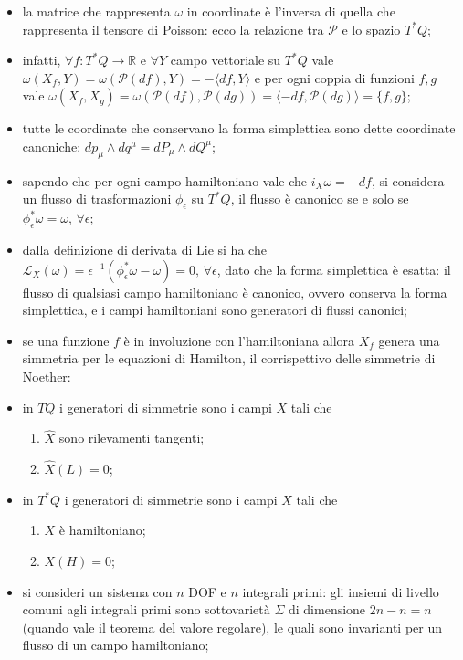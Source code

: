 \documentclass{article}
\theoremstyle{remark}
\begin{document}
\begin{itemize}
    \item la matrice che rappresenta $\omega$ in coordinate è l'inversa di quella che rappresenta il tensore di Poisson: ecco la relazione tra $\mathcal{P}$ e lo spazio $T^*Q$;
    \item infatti, $\forall f:T^*Q\to\mathbb{R}$ e $\forall Y$ campo vettoriale su $T^*Q$ vale $\omega(X_f,Y)=\omega(\mathcal{P}(df),Y)=-\langle df,Y\rangle$ e per ogni coppia di funzioni $f,g$ vale $\omega(X_f,X_g)=\omega(\mathcal{P}(df),\mathcal{P}(dg))=\langle-df,\mathcal{P}(dg)\rangle=\{f,g\}$;
    \item tutte le coordinate che conservano la forma simplettica sono dette coordinate canoniche: $dp_\mu\wedge dq^\mu=dP_\mu\wedge dQ^\mu$;
    \item sapendo che per ogni campo hamiltoniano vale che $i_X\omega=-df$, si considera un flusso di trasformazioni $\phi_\epsilon$ su $T^*Q$, il flusso è canonico se e solo se $\phi_\epsilon^*\omega=\omega,\,\forall\epsilon$;
    \item dalla definizione di derivata di Lie si ha che $\mathcal{L}_X(\omega)=\epsilon^{-1}(\phi_\epsilon^*\omega-\omega)=0,\,\forall\epsilon$, dato che la forma simplettica è esatta: il flusso di qualsiasi campo hamiltoniano è canonico, ovvero conserva la forma simplettica, e i campi hamiltoniani sono generatori di flussi canonici;
    \item se una funzione $f$ è in involuzione con l'hamiltoniana allora $X_f$ genera una simmetria per le equazioni di Hamilton, il corrispettivo delle simmetrie di Noether:
    \item in $TQ$ i generatori di simmetrie sono i campi $X$ tali che
    \begin{enumerate}
        \item $\hat{X}$ sono rilevamenti tangenti;
        \item $\hat{X}(L)=0$;
    \end{enumerate}
    \item in $T^*Q$ i generatori di simmetrie sono i campi $X$ tali che
    \begin{enumerate}
        \item $X$ è hamiltoniano;
        \item $X(H)=0$; 
    \end{enumerate}
    \item si consideri un sistema con $n$ DOF e $n$ integrali primi: gli insiemi di livello comuni agli integrali primi sono sottovarietà $\Sigma$ di dimensione $2n-n=n$ (quando vale il teorema del valore regolare), le quali sono invarianti per un flusso di un campo hamiltoniano;

\end{itemize}
\end{document}
